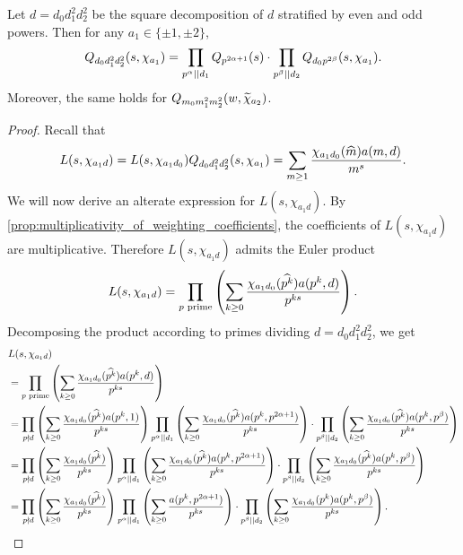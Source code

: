 \documentclass[12pt,reqno,oneside]{amsart}
\begin{document}
    \begin{theorem}\label{thm:correction_polynomial_Euler_product}
        Let $d = d_{0}d_{1}^{2}d_{2}^{2}$ be the square decomposition of $d$ stratified by even and odd powers. Then for any $a_{1} \in \{\pm1,\pm2\}$,
        \[
            Q_{d_{0}d_{1}^{2}d_{2}^{2}}(s,\chi_{a_{1}}) = \prod_{p^{\alpha} \mid\mid d_{1}}Q_{p^{2\alpha+1}}(s) \cdot \prod_{p^{\beta} \mid\mid d_{2}}Q_{d_{0}p^{2\beta}}(s,\chi_{a_{1}}).
        \]
        Moreover, the same holds for $Q_{m_{0}m_{1}^{2}m_{2}^{2}}(w,\widetilde{\chi}
        _{a_{2}})$.
    \end{theorem}
    \begin{proof}
        Recall that
        \[
            L(s,\chi_{a_{1}d}) = L(s,\chi_{a_{1}d_{0}})Q_{d_{0}d_{1}^{2}d_{2}^{2}}(s,\chi_{a_{1}}) = \sum_{m \ge 1}\frac{\chi_{a_{1}d_{0}}(\widehat{m})a(m,d)}{m^{s}}.
        \]
        We will now derive an alterate expression for $L(s,\chi_{a_{1}d})$. By \cref{prop:multiplicativity_of_weighting_coefficients}, the coefficients of $L(s,\chi_{a_{1}d})$ are multiplicative. Therefore $L(s,\chi_{a_{1}d})$ admits the Euler product
        \[
            L(s,\chi_{a_{1}d}) = \prod_{\text{$p$ prime}}\left(\sum_{k \ge 0}\frac{\chi_{a_{1}d_{0}}(\widehat{p^{k}})a(p^{k},d)}{p^{ks}}\right).
        \]
        Decomposing the product according to primes dividing $d = d_{0}d_{1}^{2}d_{2}^{2}$, we get
        \begin{align*}
            & L(s,\chi_{a_{1}d}) \\
            &= \prod_{\text{$p$ prime}}\left(\sum_{k \ge 0}\frac{\chi_{a_{1}d_{0}}(\what{p^{k}})a(p^{k},d)}{p^{ks}}\right) \\
            &= \prod_{p \nmid d}\left(\sum_{k \ge 0}\frac{\chi_{a_{1}d_{0}}(\what{p^{k}})a(p^{k},1)}{p^{ks}}\right)\prod_{p^{\a} \mid\mid d_{1}}\left(\sum_{k \ge 0}\frac{\chi_{a_{1}d_{0}}(\what{p^{k}})a(p^{k},p^{2\a+1})}{p^{ks}}\right) \cdot \prod_{p^{\b} \mid\mid d_{2}}\left(\sum_{k \ge 0}\frac{\chi_{a_{1}d_{0}}(\what{p^{k}})a(p^{k},p^{\b})}{p^{ks}}\right) \\
            &= \prod_{p \nmid d}\left(\sum_{k \ge 0}\frac{\chi_{a_{1}d_{0}}(\what{p^{k}})}{p^{ks}}\right)\prod_{p^{\a} \mid\mid d_{1}}\left(\sum_{k \ge 0}\frac{\chi_{a_{1}d_{0}}(\what{p^{k}})a(p^{k},p^{2\a+1})}{p^{ks}}\right) \cdot \prod_{p^{\b} \mid\mid d_{2}}\left(\sum_{k \ge 0}\frac{\chi_{a_{1}d_{0}}(\what{p^{k}})a(p^{k},p^{\b})}{p^{ks}}\right) \\
            &= \prod_{p \nmid d}\left(\sum_{k \ge 0}\frac{\chi_{a_{1}d_{0}}(\what{p^{k}})}{p^{ks}}\right)\prod_{p^{\a} \mid\mid d_{1}}\left(\sum_{k \ge 0}\frac{a(p^{k},p^{2\a+1})}{p^{ks}}\right) \cdot \prod_{p^{\b} \mid\mid d_{2}}\left(\sum_{k \ge 0}\frac{\chi_{a_{1}d_{0}}(p^{k})a(p^{k},p^{\b})}{p^{ks}}\right).

\end{align*}
\end{proof}
\end{document}
